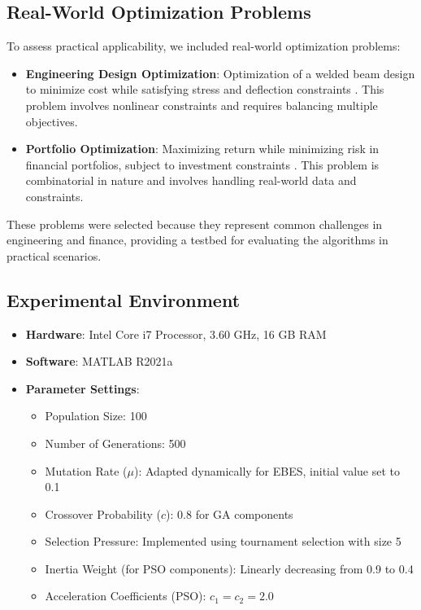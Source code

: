 \documentclass[conference]
{IEEEtran}
\begin{document}
\subsection{Real-World Optimization Problems}

To assess practical applicability, we included real-world optimization problems:

\begin{itemize}
    \item \textbf{Engineering Design Optimization}: Optimization of a welded beam design to minimize cost while satisfying stress and deflection constraints \cite{coello2000constraint}. This problem involves nonlinear constraints and requires balancing multiple objectives.
    \item \textbf{Portfolio Optimization}: Maximizing return while minimizing risk in financial portfolios, subject to investment constraints \cite{chang2000heuristics}. This problem is combinatorial in nature and involves handling real-world data and constraints.
\end{itemize}

These problems were selected because they represent common challenges in engineering and finance, providing a testbed for evaluating the algorithms in practical scenarios.

\subsection{Experimental Environment}

\begin{itemize}
    \item \textbf{Hardware}: Intel Core i7 Processor, 3.60 GHz, 16 GB RAM
    \item \textbf{Software}: MATLAB R2021a
    \item \textbf{Parameter Settings}:
    \begin{itemize}
        \item Population Size: 100
        \item Number of Generations: 500
        \item Mutation Rate ($\mu$): Adapted dynamically for EBES, initial value set to 0.1
        \item Crossover Probability ($c$): 0.8 for GA components
        \item Selection Pressure: Implemented using tournament selection with size 5
        \item Inertia Weight (for PSO components): Linearly decreasing from 0.9 to 0.4
        \item Acceleration Coefficients (PSO): $c_1 = c_2 = 2.0$
    \end{itemize}
\end{itemize}
\end{document}
